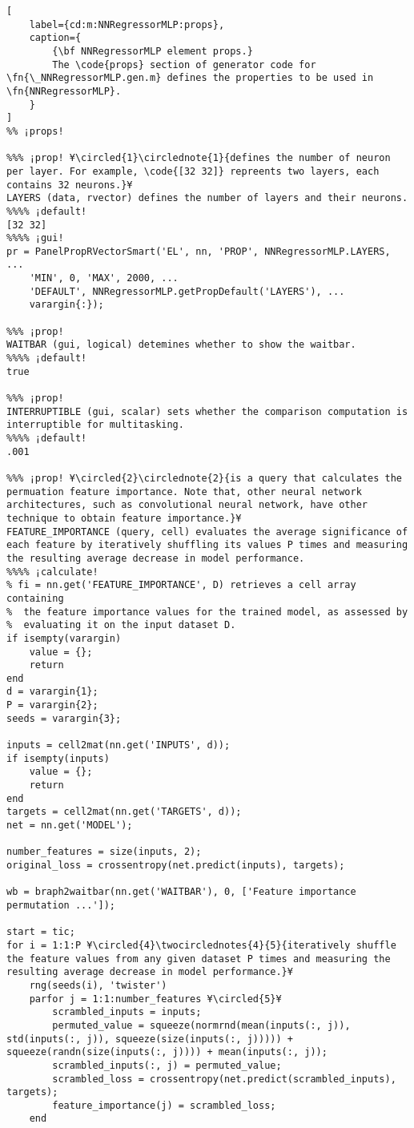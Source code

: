\documentclass{tufte-handout}
\begin{document}
\begin{lstlisting}[
	label={cd:m:NNRegressorMLP:props},
	caption={
		{\bf NNRegressorMLP element props.}
		The \code{props} section of generator code for \fn{\_NNRegressorMLP.gen.m} defines the properties to be used in \fn{NNRegressorMLP}.
	}
]
%% ¡props!

%%% ¡prop! ¥\circled{1}\circlednote{1}{defines the number of neuron per layer. For example, \code{[32 32]} repreents two layers, each contains 32 neurons.}¥
LAYERS (data, rvector) defines the number of layers and their neurons.
%%%% ¡default!
[32 32]
%%%% ¡gui!
pr = PanelPropRVectorSmart('EL', nn, 'PROP', NNRegressorMLP.LAYERS, ...
    'MIN', 0, 'MAX', 2000, ...
    'DEFAULT', NNRegressorMLP.getPropDefault('LAYERS'), ...
    varargin{:});

%%% ¡prop!
WAITBAR (gui, logical) detemines whether to show the waitbar.
%%%% ¡default!
true

%%% ¡prop!
INTERRUPTIBLE (gui, scalar) sets whether the comparison computation is interruptible for multitasking.
%%%% ¡default!
.001

%%% ¡prop! ¥\circled{2}\circlednote{2}{is a query that calculates the permuation feature importance. Note that, other neural network architectures, such as convolutional neural network, have other technique to obtain feature importance.}¥
FEATURE_IMPORTANCE (query, cell) evaluates the average significance of each feature by iteratively shuffling its values P times and measuring the resulting average decrease in model performance.
%%%% ¡calculate!
% fi = nn.get('FEATURE_IMPORTANCE', D) retrieves a cell array containing
%  the feature importance values for the trained model, as assessed by
%  evaluating it on the input dataset D.
if isempty(varargin)
    value = {};
    return
end
d = varargin{1};
P = varargin{2};
seeds = varargin{3};

inputs = cell2mat(nn.get('INPUTS', d));
if isempty(inputs)
    value = {};
    return
end
targets = cell2mat(nn.get('TARGETS', d));
net = nn.get('MODEL');

number_features = size(inputs, 2);
original_loss = crossentropy(net.predict(inputs), targets);

wb = braph2waitbar(nn.get('WAITBAR'), 0, ['Feature importance permutation ...']);

start = tic;
for i = 1:1:P ¥\circled{4}\twocirclednotes{4}{5}{iteratively shuffle the feature values from any given dataset P times and measuring the resulting average decrease in model performance.}¥
    rng(seeds(i), 'twister')
    parfor j = 1:1:number_features ¥\circled{5}¥
        scrambled_inputs = inputs;
        permuted_value = squeeze(normrnd(mean(inputs(:, j)), std(inputs(:, j)), squeeze(size(inputs(:, j))))) + squeeze(randn(size(inputs(:, j)))) + mean(inputs(:, j));
        scrambled_inputs(:, j) = permuted_value;
        scrambled_loss = crossentropy(net.predict(scrambled_inputs), targets);
        feature_importance(j) = scrambled_loss;
    end


\end{lstlisting}
\end{document}
